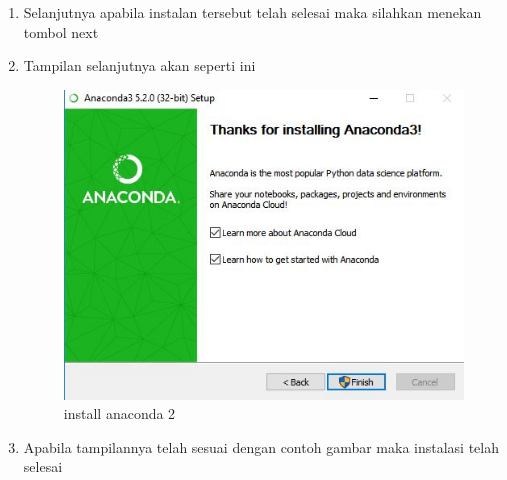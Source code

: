 \begin{enumerate}
\item Selanjutnya apabila instalan tersebut telah selesai maka silahkan menekan tombol next
\item Tampilan selanjutnya akan seperti ini

\par

\begin{figure}[ht]
\centering
\includegraphics[scale=0.5]{figures/ana2.JPG}
\caption{install anaconda 2}
\label{contoh}
\end{figure}

\par

\item Apabila tampilannya telah sesuai dengan contoh gambar maka instalasi telah selesai
\end{enumerate}


